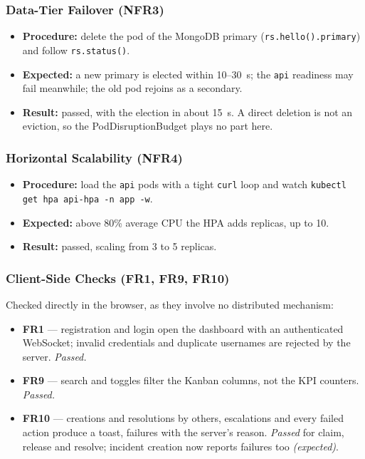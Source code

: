 \documentclass{scrartcl}
\begin{document}
\subsubsection{Data-Tier Failover (NFR3)}

\begin{itemize}
  \item \textbf{Procedure:} delete the pod of the MongoDB primary (\texttt{rs.hello().primary}) and follow \texttt{rs.status()}.
  \item \textbf{Expected:} a new primary is elected within 10--30~s; the \texttt{api} readiness may fail meanwhile; the old pod rejoins as a secondary.
  \item \textbf{Result:} passed, with the election in about 15~s. A direct deletion is not an eviction, so the PodDisruptionBudget plays no part here.
\end{itemize}

\subsubsection{Horizontal Scalability (NFR4)}

\begin{itemize}
  \item \textbf{Procedure:} load the \texttt{api} pods with a tight \texttt{curl} loop and watch \texttt{kubectl get hpa api-hpa -n app -w}.
  \item \textbf{Expected:} above 80\% average CPU the HPA adds replicas, up to 10.
  \item \textbf{Result:} passed, scaling from 3 to 5 replicas.
\end{itemize}

\subsubsection{Client-Side Checks (FR1, FR9, FR10)}

Checked directly in the browser, as they involve no distributed mechanism:
%
\begin{itemize}
  \item \textbf{FR1} --- registration and login open the dashboard with an authenticated WebSocket; invalid credentials and duplicate usernames are rejected by the server. \emph{Passed.}
  \item \textbf{FR9} --- search and toggles filter the Kanban columns, not the KPI counters. \emph{Passed.}
  \item \textbf{FR10} --- creations and resolutions by others, escalations and every failed action produce a toast, failures with the server's reason. \emph{Passed} for claim, release and resolve; incident creation now reports failures too \emph{(expected)}.
\end{itemize}
\end{document}

